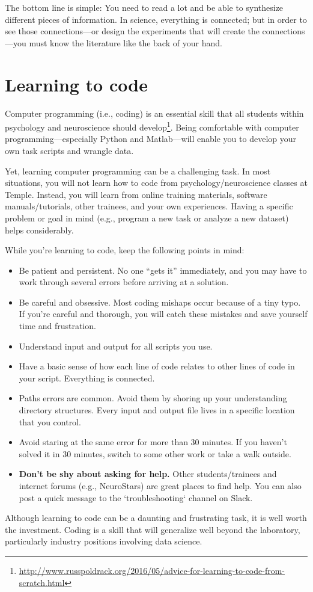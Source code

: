 \documentclass[letterpaper,11pt,oneside]{memoir}
\begin{document}
\begin{shaded}
\noindent The bottom line is simple: You need to read a lot and be able to synthesize different pieces of information. In science, everything is connected; but in order to see those connections---or design the experiments that will create the connections---you must know the literature like the back of your hand.
\end{shaded}


\section{Learning to code}
\label{sec:coding}

Computer programming (i.e., coding) is an essential skill that all students within psychology and neuroscience should develop\footnote{\url{http://www.russpoldrack.org/2016/05/advice-for-learning-to-code-from-scratch.html}}. Being comfortable with computer programming---especially Python and Matlab---will enable you to develop your own task scripts and wrangle data. 

Yet, learning computer programming can be a challenging task. In most situations, you will not learn how to code from psychology/neuroscience classes at Temple. Instead, you will learn from online training materials, software manuals/tutorials, other trainees, and your own experiences. Having a specific problem or goal in mind (e.g., program a new task or analyze a new dataset) helps considerably.

While you're learning to code, keep the following points in mind:

\begin{itemize}

\item Be patient and persistent. No one ``gets it'' immediately, and you may have to work through several errors before arriving at a solution. 
\item Be careful and obsessive. Most coding mishaps occur because of a tiny typo. If you're careful and thorough, you will catch these mistakes and save yourself time and frustration. 
\item Understand input and output for all scripts you use.
\item Have a basic sense of how each line of code relates to other lines of code in your script. Everything is connected. 
\item Paths errors are common. Avoid them by shoring up your understanding directory structures. Every input and output file lives in a specific location that you control. 
\item Avoid staring at the same error for more than 30 minutes. If you haven't solved it in 30 minutes, switch to some other work or take a walk outside.
\item \textbf{Don't be shy about asking for help.} Other students/trainees and internet forums (e.g., NeuroStars) are great places to find help. You can also post a quick message to the `troubleshooting` channel on Slack.

\end{itemize}


\begin{shaded}
\noindent Although learning to code can be a daunting and frustrating task, it is well worth the investment. Coding is a skill that will generalize well beyond the laboratory, particularly industry positions involving data science. 
\end{shaded}
\end{document}
